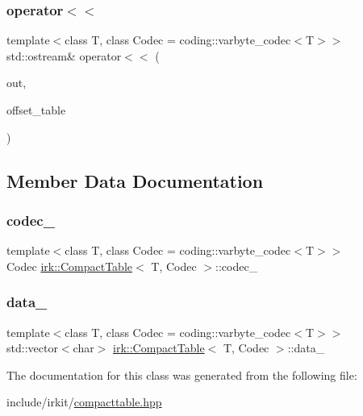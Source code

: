 \subsubsection{\texorpdfstring{operator$<$$<$}{operator<<}}
{\footnotesize\ttfamily template$<$class T, class Codec = coding\+::varbyte\+\_\+codec$<$\+T$>$$>$ \\
std\+::ostream\& operator$<$$<$ (\begin{DoxyParamCaption}\item[{std\+::ostream \&}]{out,  }\item[{const \mbox{\hyperlink{classirk_1_1CompactTable}{Compact\+Table}}$<$ T, Codec $>$ \&}]{offset\+\_\+table }\end{DoxyParamCaption})\hspace{0.3cm}{\ttfamily [friend]}}



\subsection{Member Data Documentation}
\mbox{\label{classirk_1_1CompactTable_a05373e28140104bc8242b8d053a55ce7}} 
\subsubsection{\texorpdfstring{codec\+\_\+}{codec\_}}
{\footnotesize\ttfamily template$<$class T, class Codec = coding\+::varbyte\+\_\+codec$<$\+T$>$$>$ \\
Codec \mbox{\hyperlink{classirk_1_1CompactTable}{irk\+::\+Compact\+Table}}$<$ T, Codec $>$\+::codec\+\_\+\hspace{0.3cm}{\ttfamily [protected]}}

\mbox{\label{classirk_1_1CompactTable_acaf68f9dded9dc9357bd349387fdda5c}} 
\subsubsection{\texorpdfstring{data\+\_\+}{data\_}}
{\footnotesize\ttfamily template$<$class T, class Codec = coding\+::varbyte\+\_\+codec$<$\+T$>$$>$ \\
std\+::vector$<$char$>$ \mbox{\hyperlink{classirk_1_1CompactTable}{irk\+::\+Compact\+Table}}$<$ T, Codec $>$\+::data\+\_\+\hspace{0.3cm}{\ttfamily [protected]}}



The documentation for this class was generated from the following file\+:\begin{DoxyCompactItemize}
\item 
include/irkit/\mbox{\hyperlink{compacttable_8hpp}{compacttable.\+hpp}}\end{DoxyCompactItemize}
